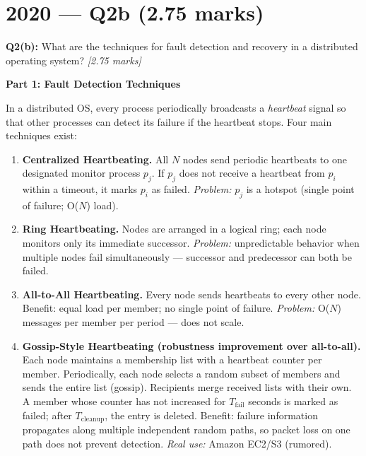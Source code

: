 \documentclass[12pt,a4paper]{article}
\begin{document}
\newpage
\section{2020 — Q2b (2.75 marks)}

\begin{qbox}
\textbf{Q2(b):} What are the techniques for fault detection and recovery in a distributed
operating system? \hfill \textit{[2.75 marks]}
\end{qbox}

\begin{solbox}
\textbf{Part 1: Fault Detection Techniques}

In a distributed OS, every process periodically broadcasts a \emph{heartbeat} signal
so that other processes can detect its failure if the heartbeat stops.
Four main techniques exist:

\medskip
\begin{enumerate}
  \item \textbf{Centralized Heartbeating.}
        All $N$ nodes send periodic heartbeats to one designated monitor process $p_j$.
        If $p_j$ does not receive a heartbeat from $p_i$ within a timeout, it marks $p_i$
        as failed.
        \textit{Problem:} $p_j$ is a hotspot (single point of failure; O($N$) load).

  \item \textbf{Ring Heartbeating.}
        Nodes are arranged in a logical ring; each node monitors only its immediate
        successor.
        \textit{Problem:} unpredictable behavior when multiple nodes fail simultaneously
        — successor and predecessor can both be failed.

  \item \textbf{All-to-All Heartbeating.}
        Every node sends heartbeats to every other node.
        Benefit: equal load per member; no single point of failure.
        \textit{Problem:} O($N$) messages per member per period — does not scale.

  \item \textbf{Gossip-Style Heartbeating (robustness improvement over all-to-all).}
        Each node maintains a membership list with a heartbeat counter per member.
        Periodically, each node selects a random subset of members and sends the entire
        list (gossip). Recipients merge received lists with their own.
        A member whose counter has not increased for $T_{\text{fail}}$ seconds is marked
        as failed; after $T_{\text{cleanup}}$, the entry is deleted.
        Benefit: failure information propagates along multiple independent random paths,
        so packet loss on one path does not prevent detection.
        \textit{Real use:} Amazon EC2/S3 (rumored).
\end{enumerate}


\end{solbox}
\end{document}
